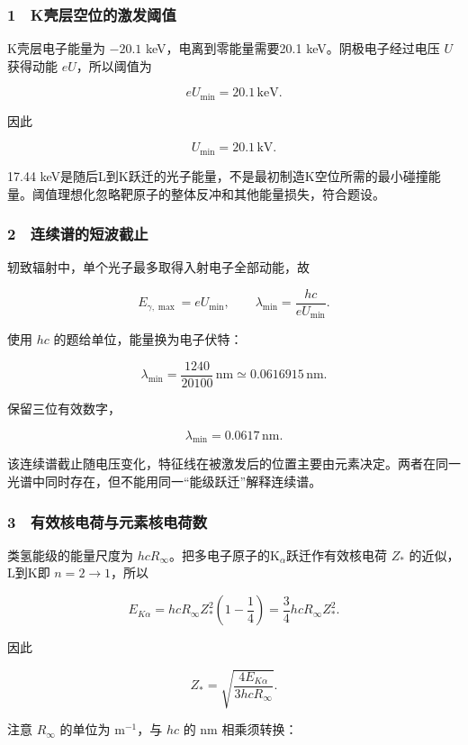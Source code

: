 \documentclass[12pt,a4paper,fontset=fandol]{ctexart}
\begin{document}
\subsubsection{1　K壳层空位的激发阈值}\label{kux58f3ux5c42ux7a7aux4f4dux7684ux6fc0ux53d1ux9608ux503c}

K壳层电子能量为 \(-20.1\) keV，电离到零能量需要20.1
keV。阴极电子经过电压 \(U\) 获得动能 \(eU\)，所以阈值为

\[eU_{\min}=20.1\,\mathrm{keV}.\]

因此

\[\boxed{U_{\min}=20.1\,\mathrm{kV}.}\]

17.44
keV是随后L到K跃迁的光子能量，不是最初制造K空位所需的最小碰撞能量。阈值理想化忽略靶原子的整体反冲和其他能量损失，符合题设。

\subsubsection{2　连续谱的短波截止}\label{ux8fdeux7eedux8c31ux7684ux77edux6ce2ux622aux6b62}

轫致辐射中，单个光子最多取得入射电子全部动能，故

\[E_{\gamma,\max}=eU_{\min},\qquad
\lambda_{\min}=\frac{hc}{eU_{\min}}.\]

使用 \(hc\) 的题给单位，能量换为电子伏特：

\[\lambda_{\min}=\frac{1240}{20100}\,\mathrm{nm}
\simeq0.0616915\,\mathrm{nm}.\]

保留三位有效数字，

\[\boxed{\lambda_{\min}=0.0617\,\mathrm{nm}.}\]

该连续谱截止随电压变化，特征线在被激发后的位置主要由元素决定。两者在同一光谱中同时存在，但不能用同一``能级跃迁''解释连续谱。

\subsubsection{3　有效核电荷与元素核电荷数}\label{ux6709ux6548ux6838ux7535ux8377ux4e0eux5143ux7d20ux6838ux7535ux8377ux6570}

类氢能级的能量尺度为
\(hcR_\infty\)。把多电子原子的K\(_\alpha\)跃迁作有效核电荷 \(Z_*\)
的近似，L到K即 \(n=2\to1\)，所以

\[E_{K\alpha}=hcR_\infty Z_*^2
\left(1-\frac14\right)=\frac34hcR_\infty Z_*^2.\]

因此

\[\boxed{Z_*=
\sqrt{\frac{4E_{K\alpha}}{3hcR_\infty}}.}\]

注意 \(R_\infty\) 的单位为 \(\mathrm{m^{-1}}\)，与 \(hc\) 的 nm
相乘须转换：
\end{document}
